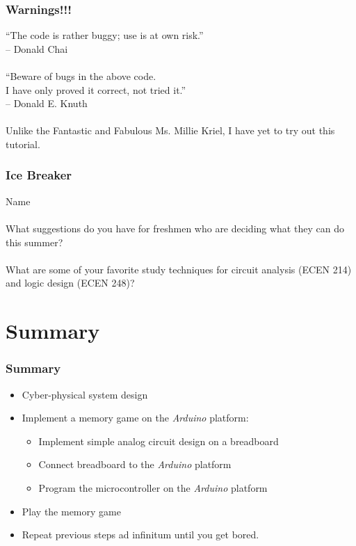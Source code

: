 \documentclass[xcolor={usenames,dvipsnames},hyperref={hyperindex,bookmarks}]{beamer}
\begin{document}
\frame
{
	\frametitle{Warnings!!!}

	``The code is rather buggy; use is at own risk.'' \\
	-- Donald Chai \\
	\ \\
	``Beware of bugs in the above code. \\
	I have only proved it correct, not tried it.'' \\
	-- Donald E. Knuth \ \\
	\ \\
	Unlike the Fantastic and Fabulous Ms. Millie Kriel, I have yet to try out this tutorial.
}




\frame
{
	\frametitle{Ice Breaker}

	Name \\
	\ \\
	What suggestions do you have for freshmen who are deciding what they can do this summer? \\
	\ \\
	What are some of your favorite study techniques for circuit analysis (ECEN 214) and logic design (ECEN 248)? \\
}







\section{Summary}

\frame
{
	\frametitle{Summary}

	\begin{itemize}
	\item Cyber-physical system design
	\item Implement a memory game on the {\it Arduino} platform: %
		\begin{itemize} %
		\item Implement simple analog circuit design on a breadboard
		\item Connect breadboard to the {\it Arduino} platform
		\item Program the microcontroller on the {\it Arduino} platform
		\end{itemize}
	\item Play the memory game
	\item Repeat previous steps ad infinitum until you get bored.
	\end{itemize}
}
\end{document}

